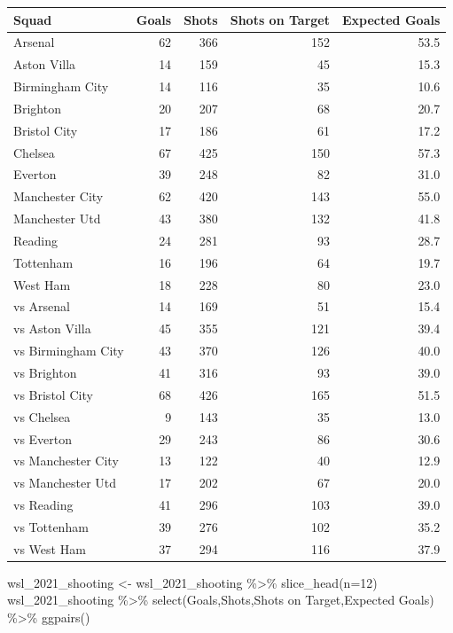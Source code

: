 \documentclass[
  11pt,
]{book}
\newenvironment{Shaded}{\begin{snugshade}}{\end{snugshade}}
\newcommand{\AttributeTok}[1]{\textcolor[rgb]{0.77,0.63,0.00}{#1}}
\newcommand{\DecValTok}[1]{\textcolor[rgb]{0.00,0.00,0.81}{#1}}
\newcommand{\FunctionTok}[1]{\textcolor[rgb]{0.00,0.00,0.00}{#1}}
\newcommand{\NormalTok}[1]{#1}
\newcommand{\OtherTok}[1]{\textcolor[rgb]{0.56,0.35,0.01}{#1}}
\newcommand{\SpecialCharTok}[1]{\textcolor[rgb]{0.00,0.00,0.00}{#1}}
\newcommand{\StringTok}[1]{\textcolor[rgb]{0.31,0.60,0.02}{#1}}
\theoremstyle{definition}
\theoremstyle{definition}
\theoremstyle{definition}
\theoremstyle{definition}
\theoremstyle{remark}
\begin{document}
\begin{table}[H]
\centering
\begin{tabular}{lrrrr}
\toprule
Squad & Goals & Shots & Shots on Target & Expected Goals\\
\midrule
Arsenal & 62 & 366 & 152 & 53.5\\
Aston Villa & 14 & 159 & 45 & 15.3\\
Birmingham City & 14 & 116 & 35 & 10.6\\
Brighton & 20 & 207 & 68 & 20.7\\
Bristol City & 17 & 186 & 61 & 17.2\\
Chelsea & 67 & 425 & 150 & 57.3\\
Everton & 39 & 248 & 82 & 31.0\\
Manchester City & 62 & 420 & 143 & 55.0\\
Manchester Utd & 43 & 380 & 132 & 41.8\\
Reading & 24 & 281 & 93 & 28.7\\
Tottenham & 16 & 196 & 64 & 19.7\\
West Ham & 18 & 228 & 80 & 23.0\\
vs Arsenal & 14 & 169 & 51 & 15.4\\
vs Aston Villa & 45 & 355 & 121 & 39.4\\
vs Birmingham City & 43 & 370 & 126 & 40.0\\
vs Brighton & 41 & 316 & 93 & 39.0\\
vs Bristol City & 68 & 426 & 165 & 51.5\\
vs Chelsea & 9 & 143 & 35 & 13.0\\
vs Everton & 29 & 243 & 86 & 30.6\\
vs Manchester City & 13 & 122 & 40 & 12.9\\
vs Manchester Utd & 17 & 202 & 67 & 20.0\\
vs Reading & 41 & 296 & 103 & 39.0\\
vs Tottenham & 39 & 276 & 102 & 35.2\\
vs West Ham & 37 & 294 & 116 & 37.9\\
\bottomrule
\end{tabular}
\end{table}

\newpage

\begin{Shaded}
\begin{Highlighting}[]
\NormalTok{wsl\_2021\_shooting }\OtherTok{\textless{}{-}}\NormalTok{ wsl\_2021\_shooting }\SpecialCharTok{\%\textgreater{}\%}
  \FunctionTok{slice\_head}\NormalTok{(}\AttributeTok{n=}\DecValTok{12}\NormalTok{)}
\NormalTok{wsl\_2021\_shooting }\SpecialCharTok{\%\textgreater{}\%} 
  \FunctionTok{select}\NormalTok{(Goals,Shots,}\StringTok{\textasciigrave{}}\AttributeTok{Shots on Target}\StringTok{\textasciigrave{}}\NormalTok{,}\StringTok{\textasciigrave{}}\AttributeTok{Expected Goals}\StringTok{\textasciigrave{}}\NormalTok{) }\SpecialCharTok{\%\textgreater{}\%} 
  \FunctionTok{ggpairs}\NormalTok{()}
\end{Highlighting}
\end{Shaded}
\end{document}
